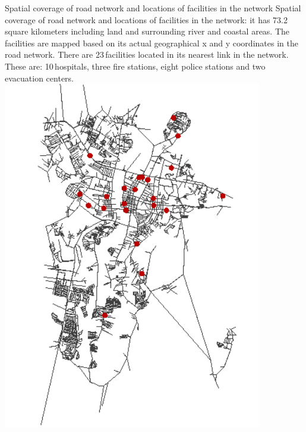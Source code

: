 \createfigure%
{Spatial coverage of road network and locations of facilities in the network}%
{Spatial coverage of road network and locations of facilities in the network: it has 73.2\,square kilometers including land and surrounding river and coastal areas. The facilities are mapped based on its actual geographical x and y coordinates in the road network. There are 23\,facilities located in its nearest link in the network. These are: 10\,hospitals, three fire stations, eight police stations and two evacuation centers.}%
{\label{fig:philippines_fig3}}%
{\includegraphics[width=0.85\textwidth, angle=0]{./scenarios/figures/philippines_fig3.png}}%
{}

